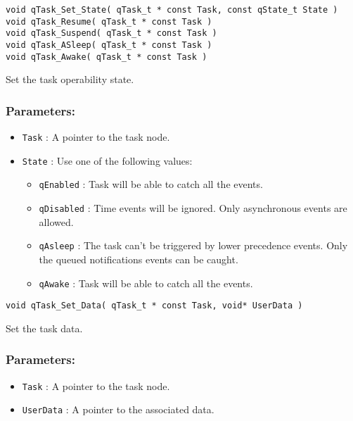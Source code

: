 \noindent\hrulefill


\begin{lstlisting}[style=CStyle]
void qTask_Set_State( qTask_t * const Task, const qState_t State ) 
void qTask_Resume( qTask_t * const Task ) 
void qTask_Suspend( qTask_t * const Task )
void qTask_ASleep( qTask_t * const Task )
void qTask_Awake( qTask_t * const Task )
\end{lstlisting}   

Set the task operability state.   

\subsubsection*{Parameters:}
\begin{itemize}
    \item \lstinline{Task} : A pointer to the task node.
    \item \lstinline{State} : Use one of the following values:
    \begin{itemize}
        \item \lstinline{qEnabled} : Task will be able to catch all the events.
        \item \lstinline{qDisabled} : Time events will be ignored. Only asynchronous events are allowed.
        \item \lstinline{qAsleep} : The task can't be triggered by lower precedence events. Only the queued notifications events can be caught.
        \item \lstinline{qAwake} : Task will be able to catch all the events.
    \end{itemize}
\end{itemize}

\noindent\hrulefill


\begin{lstlisting}[style=CStyle]
void qTask_Set_Data( qTask_t * const Task, void* UserData )
\end{lstlisting}

Set the task data. 

\subsubsection*{Parameters:}
\begin{itemize}
    \item \lstinline{Task} : A pointer to the task node.
    \item \lstinline{UserData} : A pointer to the associated data.
\end{itemize}

